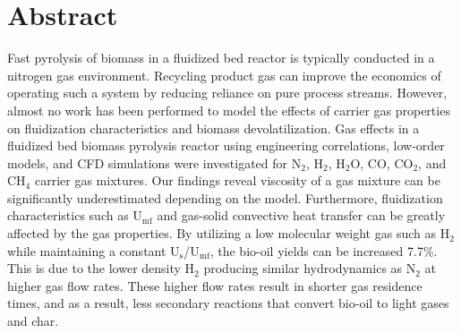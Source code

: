 
\section*{Abstract}

Fast pyrolysis of biomass in a fluidized bed reactor is typically conducted in a nitrogen gas environment. Recycling product gas can improve the economics of operating such a system by reducing reliance on pure process streams. However, almost no work has been performed to model the effects of carrier gas properties on fluidization characteristics and biomass devolatilization. Gas effects in a fluidized bed biomass pyrolysis reactor using engineering correlations, low-order models, and CFD simulations were investigated for N$_2$, H$_2$, H$_2$O, CO, CO$_2$, and CH$_4$ carrier gas mixtures. Our findings reveal viscosity of a gas mixture can be significantly underestimated depending on the model. Furthermore, fluidization characteristics such as U$_\textrm{mf}$ and gas-solid convective heat transfer can be greatly affected by the gas properties. By utilizing a low molecular weight gas such as H$_2$ while maintaining a constant U$_\text{s}$/U$_\text{mf}$, the bio-oil yields can be increased 7.7\%. This is due to the lower density H$_2$ producing similar hydrodynamics as N$_2$ at higher gas flow rates. These higher flow rates result in shorter gas residence times, and as a result, less secondary reactions that convert bio-oil to light gases and char.
